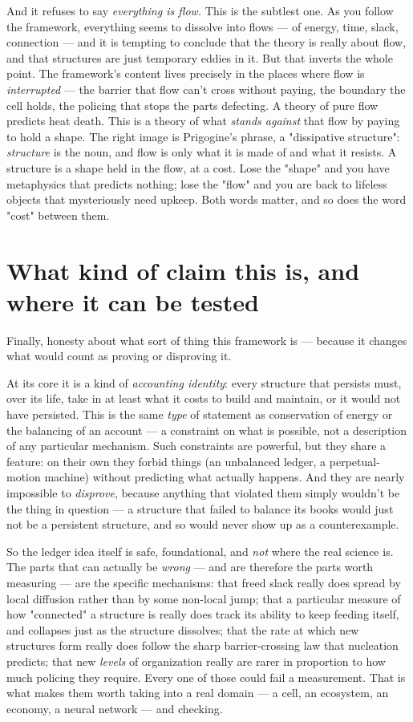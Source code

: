 \documentclass{article}
\begin{document}
And it refuses to say \textit{everything is flow.} This is the subtlest one. As you follow the framework, everything seems to dissolve into flows --- of energy, time, slack, connection --- and it is tempting to conclude that the theory is really about flow, and that structures are just temporary eddies in it. But that inverts the whole point. The framework's content lives precisely in the places where flow is \textit{interrupted} --- the barrier that flow can't cross without paying, the boundary the cell holds, the policing that stops the parts defecting. A theory of pure flow predicts heat death. This is a theory of what \textit{stands against} that flow by paying to hold a shape. The right image is Prigogine's phrase, a "dissipative structure": \textit{structure} is the noun, and flow is only what it is made of and what it resists. A structure is a shape held in the flow, at a cost. Lose the "shape" and you have metaphysics that predicts nothing; lose the "flow" and you are back to lifeless objects that mysteriously need upkeep. Both words matter, and so does the word "cost" between them.

\section{What kind of claim this is, and where it can be tested}

Finally, honesty about what sort of thing this framework is --- because it changes what would count as proving or disproving it.

At its core it is a kind of \textit{accounting identity}: every structure that persists must, over its life, take in at least what it costs to build and maintain, or it would not have persisted. This is the same \textit{type} of statement as conservation of energy or the balancing of an account --- a constraint on what is possible, not a description of any particular mechanism. Such constraints are powerful, but they share a feature: on their own they forbid things (an unbalanced ledger, a perpetual-motion machine) without predicting what actually happens. And they are nearly impossible to \textit{disprove}, because anything that violated them simply wouldn't be the thing in question --- a structure that failed to balance its books would just not be a persistent structure, and so would never show up as a counterexample.

So the ledger idea itself is safe, foundational, and \textit{not} where the real science is. The parts that can actually be \textit{wrong} --- and are therefore the parts worth measuring --- are the specific mechanisms: that freed slack really does spread by local diffusion rather than by some non-local jump; that a particular measure of how "connected" a structure is really does track its ability to keep feeding itself, and collapses just as the structure dissolves; that the rate at which new structures form really does follow the sharp barrier-crossing law that nucleation predicts; that new \textit{levels} of organization really are rarer in proportion to how much policing they require. Every one of those could fail a measurement. That is what makes them worth taking into a real domain --- a cell, an ecosystem, an economy, a neural network --- and checking.
\end{document}
